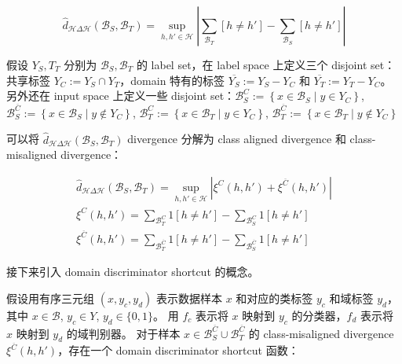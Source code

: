 \documentclass[UTF8]{ctexart}
\begin{document}
                $$
                    \hat{d}_{\mathcal{H}\Delta\mathcal{H}}(\mathcal{B}_S, \mathcal{B}_T)
                    =\sup_{h,h'\in \mathcal{H}}\left \vert \sum_{\mathcal{B}_T}\left [ h\neq h' \right ]-  \sum_{\mathcal{B}_S}\left [ h\neq h' \right ]\right \vert
                $$

                假设 $Y_S, T_T$ 分别为 $\mathcal B_S, \mathcal B_T$ 的 label set，在 label space 上定义三个 disjoint set：
                共享标签 $Y_C:=Y_S \cap  Y_T$，domain 特有的标签 $\overline{Y_{S}}:=Y_S-Y_C$ 和 $\overline{Y_{T}}:=Y_T-Y_C$。
                另外还在 input space 上定义一些 disjoint set：$\mathcal{B}_S^C:=\left \{ x\in \mathcal{B}_S \mid y\in Y_C \right \}$, $\mathcal{B}^{\overline{C}}_{S}:=\left \{ x\in \mathcal{B}_S \mid y\notin Y_C \right \}$, 
                $\mathcal{B}_T^C:=\left \{ x\in \mathcal{B}_T \mid y\in Y_C \right \}$, $\mathcal{B}^{\overline{C}}_{T}:=\left \{ x\in \mathcal{B}_T \mid y\notin Y_C \right \}$

                可以将 $\hat{d}_{\mathcal{H}\Delta\mathcal{H}}(\mathcal{B}_S, \mathcal{B}_T)$ divergence 分解为 class aligned divergence 
                和 class-misaligned divergence：

                \begin{align*}
                    \hat{d}_{\mathcal{H}\Delta\mathcal{H}}(\mathcal{B}_S, \mathcal{B}_T)=\sup_{h,h'\in \mathcal{H}}\left |\xi^C(h, h') +  \xi^{\overline{C}}(h, h') \right |\\
                    \xi^C(h, h')= \sum_{\mathcal{B}_T^C}1\left [ h\neq h' \right ]-  \sum_{ \mathcal{B}_S^C} 1\left [ h\neq h' \right ]\\
                    \xi^{\overline{C}}(h, h')= \sum_{\mathcal{B}^{\overline{C}}_{T}} 1\left [ h\neq h' \right ]-  \sum_{\mathcal{B}^{\overline{C}}_{S}} 1\left [ h\neq h' \right ]
                \end{align*}

                接下来引入 domain discriminator shortcut 的概念。

                假设用有序三元组 $\left ( x, y_c, y_d\right )$ 表示数据样本 $x$ 和对应的类标签 $y_c$ 和域标签 $y_d$，
                其中 $x\in\mathcal{B}$, $y_c\in Y$, $y_d\in \{0,1\}$。
                用 $f_c$ 表示将 $x$ 映射到 $y_c$ 的分类器，$f_d$ 表示将 $x$ 映射到 $y_d$ 的域判别器。
                对于样本 $x\in \mathcal{B}^{\overline{C}}_{S} \cup \mathcal{B}^{\overline{C}}_{T}$ 的 
                class-misaligned divergence $\xi^{\overline{C}}(h, h')$，存在一个 domain discriminator shortcut 函数：
\end{document}
